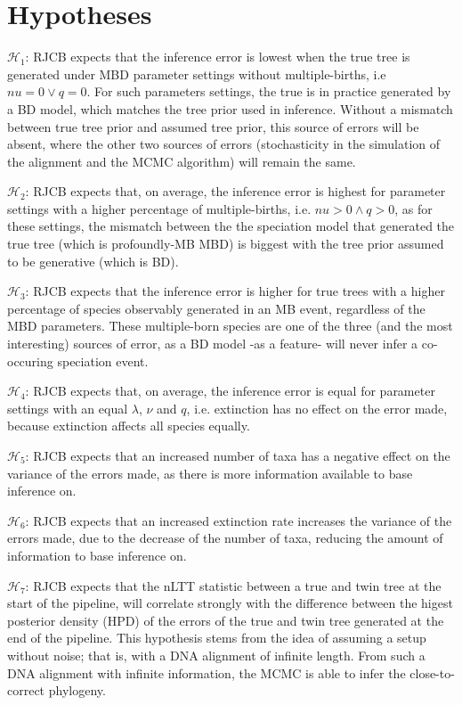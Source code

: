 \section{Hypotheses}

$\mathcal{H}_1$: RJCB expects that the inference error is lowest when the true
tree is generated under MBD parameter settings without multiple-births, i.e
$nu = 0 \vee q = 0$. For such parameters settings, the
true is in practice generated by a BD model, which
matches the tree prior used in inference. Without a mismatch between
true tree prior and assumed tree prior, this source of errors will be absent,
where the other two sources of errors (stochasticity in the
simulation of the alignment and the MCMC algorithm) 
will remain the same. 

$\mathcal{H}_2$: RJCB expects that, on average, the inference error is highest for
parameter settings with a higher percentage of multiple-births,
i.e. $nu > 0 \wedge q > 0$, as for these settings, 
the mismatch between the the speciation model that
generated the true tree (which is profoundly-MB MBD) is biggest with
the tree prior assumed to be generative (which is BD). 

$\mathcal{H}_3$: RJCB expects that the inference error is higher for true trees
with a higher percentage of species observably generated in an MB event,
regardless of the MBD parameters.
These multiple-born species are one of the three (and the most 
interesting) sources of error, as a BD model -as a feature- will never
infer a co-occuring speciation event. 

$\mathcal{H}_4$: RJCB expects that, on average, the inference error is equal for
parameter settings with an equal $\lambda$, $\nu$ and $q$, i.e. extinction
has no effect on the error made, because extinction affects all species equally. 

$\mathcal{H}_5$: RJCB expects that an increased number of taxa
has a negative effect on the variance of the errors made, as there
is more information available to base inference on.

$\mathcal{H}_6$: RJCB expects that an increased extinction rate
increases the variance of the errors made,
due to the decrease of the number of taxa, reducing the amount of information
to base inference on.

$\mathcal{H}_7$: RJCB expects that the nLTT statistic between a true and twin
tree at the start of the pipeline,
will correlate strongly with the difference
between the higest posterior density (HPD) of the 
errors of the true and twin tree 
generated at the end of the pipeline. 
This hypothesis
stems from the idea of assuming a setup without noise; that is, with
a DNA alignment of infinite length. From such a DNA alignment 
with infinite information, the MCMC
is able to infer the close-to-correct phylogeny.

